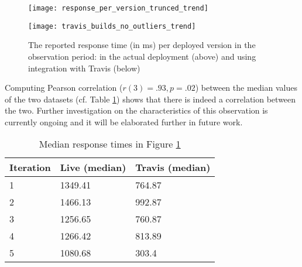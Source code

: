       \begin{figure}[h!]
        \centering
        \texttt{[image: response\_per\_version\_trunced\_trend]}


        \advance\leftskip-0.2cm
        \texttt{[image: travis\_builds\_no\_outliers\_trend]}
        \caption{The reported response time (in ms) per deployed version in the observation period: 
        in the actual deployment (above) and using integration with Travis (below)}        
        
        \label{fig:response_times_preemptive}
      \end{figure}

  Computing Pearson correlation ($r(3)=.93, p=.02$) between the median values of the two datasets (cf. Table \ref{tab:correlations}) shows that there is indeed a correlation between the two. Further investigation on the characteristics of this observation is currently ongoing and it will be elaborated further in future work.


    \begin{table}[h]
      
      \centering
      \begin{tabular}{lll}
        \toprule
        Iteration & \bfseries Live (median) & \bfseries Travis (median)\\
        \midrule
        1 & 1349.41 & 764.87\\ 
        2 & 1466.13 & 992.87\\
        3 & 1256.65 & 760.87\\
        4 & 1266.42 & 813.89\\
        5 & 1080.68 & 303.4\\
        \bottomrule
      
      \end{tabular}
      \caption{Median response times in Figure \ref{fig:response_times_preemptive}}
      \label{tab:correlations}
    \end{table}




  

